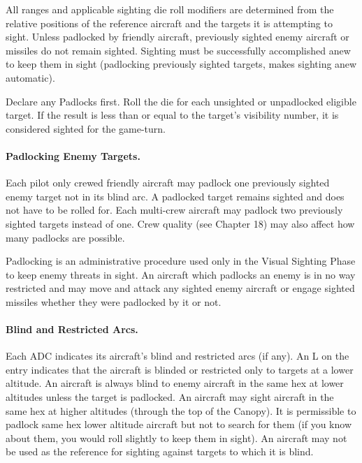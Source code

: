 {All ranges and applicable sighting die roll modifiers are determined from the relative positions of the reference aircraft and the targets it is attempting to sight. Unless padlocked by friendly aircraft, previously sighted enemy aircraft or missiles do not remain sighted. Sighting must be successfully accomplished anew to keep them in sight (padlocking previously sighted targets, makes sighting anew automatic).

Declare any Padlocks first. Roll the die for each unsighted or unpadlocked eligible target. If the result is less than or equal to the target's visibility number, it is considered sighted for the game-turn. 

\paragraph{Padlocking Enemy Targets.} Each pilot only crewed friendly aircraft may padlock one previously sighted enemy target not in its blind arc. A padlocked target remains sighted and does not have to be rolled for. Each multi-crew aircraft may padlock two previously sighted targets instead of one. Crew quality (see Chapter 18) may also affect how many padlocks are possible.

Padlocking is an administrative procedure used only in the Visual Sighting Phase to keep enemy threats in sight. An aircraft which padlocks an enemy is in no way restricted and may move and attack any sighted enemy aircraft or engage sighted missiles whether they were padlocked by it or not. 

\paragraph{Blind and Restricted Arcs.} Each ADC indicates its aircraft's blind and restricted arcs (if any). An L on the entry indicates that the aircraft is blinded or restricted only to targets at a lower altitude. An aircraft is always blind to enemy aircraft in the same hex at lower altitudes unless the target is padlocked. An aircraft may sight aircraft in the same hex at higher altitudes (through the top of the Canopy). It is permissible to padlock same hex lower altitude aircraft but not to search for them (if you know about them, you would roll slightly to keep them in sight). An aircraft may not be used as the reference for sighting against targets to which it is blind.

}
